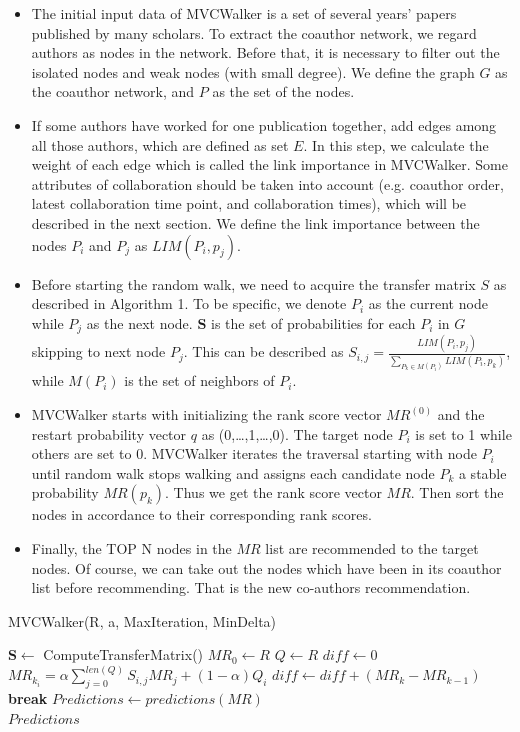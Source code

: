 \documentclass[10pt,journal,compsoc]{IEEEtran}
\newcommand{\algorithmicbreak}{\textbf{break}}
\newcommand{\BREAK}{\State \algorithmicbreak}
\begin{document}
\begin{itemize}
\item The initial input data of MVCWalker is a set of several years' papers published by many scholars. To extract the coauthor network, we regard authors as nodes in the network. Before that, it is necessary to filter out the isolated nodes and weak nodes (with small degree). We define the graph $G$ as the coauthor network, and $P$ as the set of the nodes.
\item If some authors have worked for one publication together, add edges among all those authors, which are defined as set $E$. In this step, we calculate the weight of each edge which is called the link importance in MVCWalker. Some attributes of collaboration should be taken into account (e.g. coauthor order, latest collaboration time point, and collaboration times), which will be described in the next section. We define the link importance between the nodes $P_{i}$ and $P_{j}$ as $LIM(P_{i},p_{j})$.
\item Before starting the random walk, we need to acquire the transfer matrix $S$ as described in Algorithm 1. To be specific, we denote $P_{i}$ as the current node while $P_{j}$ as the next node. $\mathbf{S}$ is the set of probabilities for each $P_{i}$ in $G$ skipping to next node $P_{j}$. This can be described as $S_{i,j}=\frac{LIM(P_{i},p_{j})}{\sum_{P_{k}\in M(P_{i})} LIM(P_{i},p_{k})}$, while $M(P_{i})$ is the set of neighbors of $P_{i}$.
\item MVCWalker starts with initializing the rank score vector $MR^{(0)}$ and the restart probability vector $q$ as (0,\ldots,1,\ldots,0). The target node $P_{i}$ is set to 1 while others are set to 0. MVCWalker iterates the traversal starting with node $P_{i}$ until random walk stops walking and assigns each candidate node $P_{k}$ a stable probability $MR(p_{k})$. Thus we get the rank score vector $MR$. Then sort the nodes in accordance to their corresponding rank scores.
\item Finally, the TOP N nodes in the $MR$ list are recommended to the target nodes. Of course, we can take out the nodes which have been in its coauthor list before recommending. That is the new co-authors recommendation.
\end{itemize}

\begin{algorithm}
  \caption{MVCWalker(R, a, MaxIteration, MinDelta)}
  \begin{algorithmic}[1]
    \State $\mathbf{S}\leftarrow$ ComputeTransferMatrix()
    \State $MR_{0} \leftarrow R$
    \State $Q \leftarrow R$
        \State $diff \leftarrow 0$
            \State $MR_{k_{i}} = \alpha\sum_{j=0}^{len(Q)} S_{i,j}MR_{j}+(1-\alpha) Q_{i}$
            \State $diff \leftarrow diff +(MR_{k}-MR_{k-1})$
        \EndFor
            \BREAK
        \EndIf
    \EndFor
    \State $Predictions \leftarrow predictions(MR)$\\
    \Return $Predictions$
  \end{algorithmic}
\end{algorithm}
\end{document}
